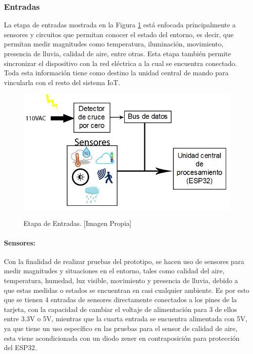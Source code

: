 	\subsubsection{Entradas}
	
	La etapa de entradas mostrada en la Figura \ref{fig:BEntradas} está enfocada principalmente a sensores y circuitos que permitan conocer el estado del entorno, es decir, que permitan medir magnitudes como temperatura, iluminación, movimiento, presencia de lluvia, calidad de aire, entre otras. Esta etapa también permite sincronizar el dispositivo con la red eléctrica a la cual se encuentra conectado. Toda esta información tiene como destino la unidad central de mando para vincularla con el resto del sistema IoT.\\
	
	\begin{figure}[!t]
		\centering
		\caption[Etapa de Entradas.]{Etapa de Entradas. [Imagen Propia]}
		\includegraphics[width=0.6\linewidth]{Imagenes/B_Entradas}\label{fig:BEntradas}
	\end{figure}
	
	\paragraph{Sensores:}
		Con la finalidad de realizar pruebas del prototipo, se hacen uso de sensores para medir magnitudes y situaciones en el entorno, tales como calidad del aire, temperatura, humedad, luz visible, movimiento y presencia de lluvia, debido a que estas medidas o estados se encuentran en casi cualquier ambiente. Es por esto que se tienen 4 entradas de sensores directamente conectados a los pines de la tarjeta, con la capacidad de cambiar el voltaje de alimentación para 3 de ellos entre 3.3V o 5V, mientras que la cuarta entrada se encuentra alimentada con 5V, ya que tiene un uso específico en las pruebas para el sensor de calidad de aire, esta viene acondicionada con un diodo zener en contraposición para protección del ESP32.\\



